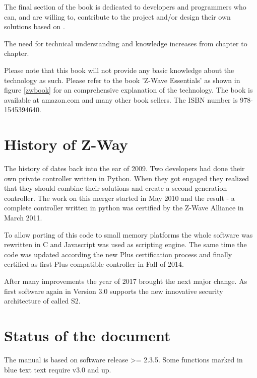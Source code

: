 The final section of the book is dedicated to developers and programmers who can, and are 
willing to, contribute to the project and/or design their own solutions based on \zway.

The need for technical understanding and knowledge increases from chapter to chapter.

Please note that this book will not provide any basic knowledge about the \zwave technology
as such. Please
refer to the book 'Z-Wave Essentials' as shown in figure \ref{zwbook} for an comprehensive
explanation of the \zwave technology. The book is available at amazon.com and many other 
book sellers. The ISBN number is 978-1545394640.


\section{History of Z-Way}

The history of \zway dates back into the ear of 2009. Two developers had done their own
private \zwave controller written in Python. When they got engaged they realized that
they should combine their solutions and create a second generation \zwave controller.
The work on this merger started in May 2010 and the result - a complete \zwave controller 
written in python was certified by the Z-Wave Alliance in March 2011.


To allow porting of this code to small memory platforms the whole software was rewritten
in C and Javascript was used as scripting engine. The same time the code was updated according 
the new \zwave Plus certification process and finally certified as first \zwave Plus 
compatible controller in Fall of 2014.
 
 
After many improvements the year of 2017 brought the next major change. As first software 
again \zway in Version 3.0 supports the new innovative security architecture of \zwave 
called S2.

\section{Status of the document}

The manual is based on \zway software release >= 2.3.5. Some functions marked in blue text
text require \zway v3.0 and up.
